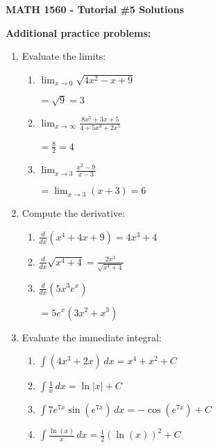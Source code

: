 \documentclass[12pt]{article}
\newcommand{\di}{\displaystyle}
\begin{document}
\author{Instructor: Sean Fitzpatrick}
\thispagestyle{empty}
\begin{center}
{\bf MATH 1560 - Tutorial \#5 Solutions}
\end{center}

\textbf{Additional practice problems:}
\begin{enumerate}
\item Evaluate the limits:
\begin{multicols}{3}
\begin{enumerate}
\item $\di \lim_{x\to 0}\sqrt{4x^2-x+9}$

$=\sqrt{9}=3$
\item $\di \lim_{x\to \infty}\frac{8x^5+3x+5}{4+5x^3+2x^5}$

$=\frac{8}{2}=4$
\item $\di \lim_{x\to 3}\frac{x^2-9}{x-3}$

$\di =\lim_{x\to 3}(x+3)=6$ 
\end{enumerate}
\end{multicols}

\item Compute the derivative:
\begin{multicols}{3}
\begin{enumerate}
\item $\di\frac{d}{dx}(x^4+4x+9)=4x^3+4$
\item $\di \frac{d}{dx}\sqrt{x^4+4}=\frac{2x^3}{\sqrt{x^4+4}}$
\item $\di\frac{d}{dx}(5x^3e^x)$

$=5e^x(3x^2+x^3)$
\end{enumerate}
\end{multicols}

\item Evaluate the immediate integral:
\begin{multicols}{2}
\begin{enumerate}
\item $\di \int(4x^3+2x)\,dx=x^4+x^2+C$
\item $\di \int\frac{1}{x}\,dx=\ln|x|+C$
\item $\di \int 7e^{7x}\sin(e^{7x})\,dx=-\cos(e^{7x})+C$
\item $\di \int \frac{\ln(x)}{x}\,dx=\frac{1}{2}(\ln(x))^2+C$
\end{enumerate}
\end{multicols}
\end{enumerate}
\end{document}
